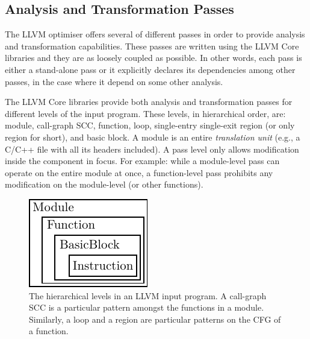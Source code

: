 \subsection{Analysis and Transformation Passes}

The LLVM optimiser offers several of different passes in order to provide analysis and transformation capabilities.
These passes are written using the LLVM Core libraries and they are as loosely coupled as possible.
In other words, each pass is either a stand-alone pass or it explicitly declares its dependencies among other passes, in the case where it depend on some other analysis.

The LLVM Core libraries provide both analysis and transformation passes for different levels of the input program.
These levels, in hierarchical order, are: module, call-graph SCC, function, loop, single-entry single-exit region (or only region for short), and basic block.
A module is an entire \textit{translation unit} (e.g., a C/C++ file with all its headers included).
A pass level only allows modification inside the component in focus.
For example: while a module-level pass can operate on the entire module at once,
a function-level pass prohibits any modification on the module-level (or other functions).

\begin{figure}[h]
  \centering
  \includegraphics[scale=1]{figs/llvm-containers.pdf}
  \caption{The hierarchical levels in an LLVM input program. A call-graph SCC is a particular pattern amongst the functions in a module.
Similarly, a loop and a region are particular patterns on the CFG of a function.}
  \label{fig:llvm-containers}
\end{figure}


